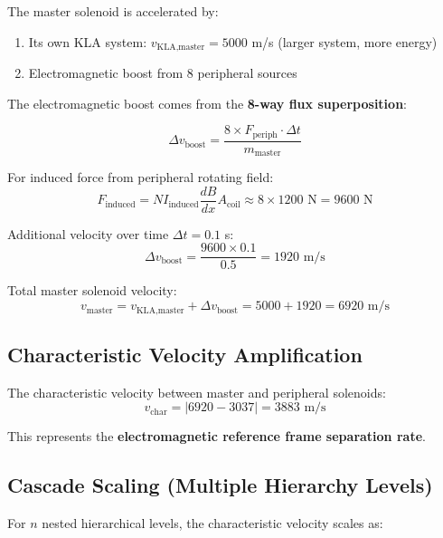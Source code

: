 \documentclass[12pt,a4paper]{article}
\begin{document}
The master solenoid is accelerated by:
\begin{enumerate}
\item Its own KLA system: $v_{\text{KLA,master}} = 5000$ m/s (larger system, more energy)
\item Electromagnetic boost from 8 peripheral sources
\end{enumerate}

The electromagnetic boost comes from the \textbf{8-way flux superposition}:

\begin{equation}
\Delta v_{\text{boost}} = \frac{8 \times F_{\text{periph}} \cdot \Delta t}{m_{\text{master}}}
\end{equation}

For induced force from peripheral rotating field:
\begin{equation}
F_{\text{induced}} = N I_{\text{induced}} \frac{dB}{dx} A_{\text{coil}} \approx 8 \times 1200 \text{ N} = 9600 \text{ N}
\end{equation}

Additional velocity over time $\Delta t = 0.1$ s:
\begin{equation}
\Delta v_{\text{boost}} = \frac{9600 \times 0.1}{0.5} = 1920 \text{ m/s}
\end{equation}

Total master solenoid velocity:
\begin{equation}
v_{\text{master}} = v_{\text{KLA,master}} + \Delta v_{\text{boost}} = 5000 + 1920 = 6920 \text{ m/s}
\end{equation}

\subsection{Characteristic Velocity Amplification}

The characteristic velocity between master and peripheral solenoids:
\begin{equation}
v_{\text{char}} = |6920 - 3037| = 3883 \text{ m/s}
\end{equation}

This represents the \textbf{electromagnetic reference frame separation rate}.

\subsection{Cascade Scaling (Multiple Hierarchy Levels)}

For $n$ nested hierarchical levels, the characteristic velocity scales as:
\end{document}
